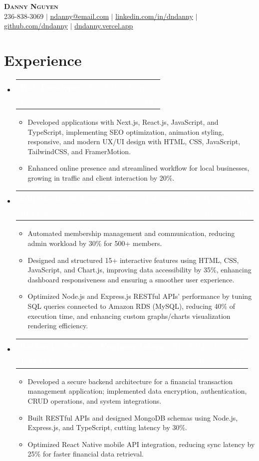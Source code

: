 \documentclass[letterpaper,11pt]{article}
\makeatletter
\newcommand{\resumeItem}[1]{
\item\small{
{#1 \vspace{-2pt}}
}
}
\newcommand{\resumeSubheading}[4]{
\vspace{-2pt}\item
\begin{tabular*}{0.97\textwidth}[t]{l@{\extracolsep{\fill}}r}
\textbf{\textcolor{white}{#1}} & \textcolor{white}{#2} \\
\textit{\small\textcolor{white}{#3}} & \textit{\small \textcolor{white}{#4}} \\
\end{tabular*}\vspace{-7pt}
}
\newcommand{\resumeSubHeadingListStart}{\begin{itemize}[leftmargin=0.15in, label={}]}
\newcommand{\resumeSubHeadingListEnd}{\end{itemize}}
\newcommand{\resumeItemListStart}{\begin{itemize}}
\newcommand{\resumeItemListEnd}{\end{itemize}\vspace{-5pt}}
\makeatother
\begin{document}
\pagecolor{black}
\color{white}

\begin{center}
\textbf{\Huge \scshape Danny Nguyen} \\ \vspace{1pt}
\small 236-838-3069 $|$ \href{mailto:ndanny@email.com}{\underline{ndanny@email.com}} $|$
\href{https://linkedin.com/in/dndanny}{\underline{linkedin.com/in/dndanny}} $|$
\href{https://github.com/dndanny}{\underline{github.com/dndanny}} $|$
\href{https://dndanny.vercel.app}{\underline{dndanny.vercel.app}}
\end{center}


\section{Experience}
\resumeSubHeadingListStart
\resumeSubheading{Web Developer}{Feb 2025 - Current}{Freelance}{Vancouver, BC}
\resumeItemListStart
\resumeItem{Developed applications with Next.js, React.js, JavaScript, and TypeScript, implementing SEO optimization, animation
styling, responsive, and modern UX/UI design with HTML, CSS, JavaScript, TailwindCSS, and FramerMotion.}
\resumeItem{Enhanced online presence and streamlined workflow for local businesses, growing in traffic and client interaction by 20\%.}
\resumeItemListEnd

\resumeSubheading{Full Stack - Software Engineer Intern}{Sep 2024 - Dec 2024}{BCIT Retirees' Association}{Burnaby, BC}
\resumeItemListStart
\resumeItem{Automated membership management and communication, reducing admin workload by 30\% for 500+ members.}
\resumeItem{Designed and structured 15+ interactive features using HTML, CSS, JavaScript, and Chart.js, improving data accessibility
by 35\%, enhancing dashboard responsiveness and ensuring a smoother user experience.}
\resumeItem{Optimized Node.js and Express.js RESTful APIs' performance by tuning SQL queries connected to Amazon RDS
(MySQL), reducing 40\% of execution time, and enhancing custom graphs/charts visualization rendering efficiency.}
\resumeItemListEnd

\resumeSubheading{Backend - Software Engineer Intern}{Apr 2024 - Jun 2024}{WALLIT}{Burnaby, BC}
\resumeItemListStart
\resumeItem{Developed a secure backend architecture for a financial transaction management application; implemented data
encryption, authentication, CRUD operations, and system integrations.}
\resumeItem{Built RESTful APIs and designed MongoDB schemas using Node.js, Express.js, and TypeScript, cutting latency by 30\%.}
\resumeItem{Optimized React Native mobile API integration, reducing sync latency by 25\% for faster financial data retrieval.}
\resumeItemListEnd
\resumeSubHeadingListEnd
\end{document}
